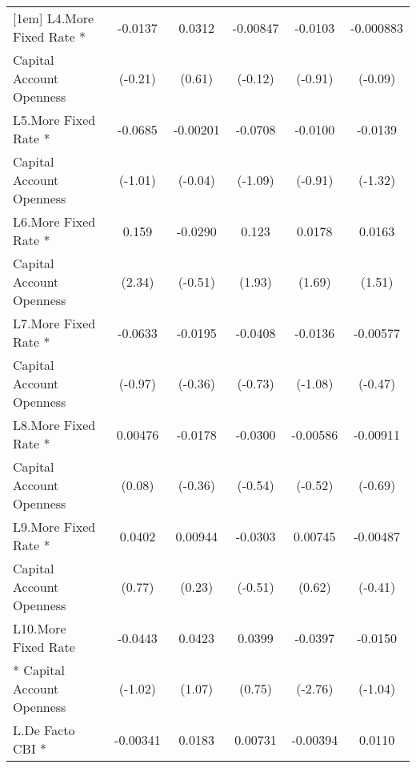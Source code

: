 {\begin{tabular}{l*{5}{c}}
[1em]
L4.More Fixed Rate *&     -0.0137         &      0.0312         &    -0.00847         &     -0.0103         &   -0.000883         \\
Capital Account Openness&     (-0.21)         &      (0.61)         &     (-0.12)         &     (-0.91)         &     (-0.09)         \\
[1em]
L5.More Fixed Rate *&     -0.0685         &    -0.00201         &     -0.0708         &     -0.0100         &     -0.0139         \\
Capital Account Openness&     (-1.01)         &     (-0.04)         &     (-1.09)         &     (-0.91)         &     (-1.32)         \\
[1em]
L6.More Fixed Rate *&       0.159\sym{*}  &     -0.0290         &       0.123         &      0.0178         &      0.0163         \\
Capital Account Openness&      (2.34)         &     (-0.51)         &      (1.93)         &      (1.69)         &      (1.51)         \\
[1em]
L7.More Fixed Rate *&     -0.0633         &     -0.0195         &     -0.0408         &     -0.0136         &    -0.00577         \\
Capital Account Openness&     (-0.97)         &     (-0.36)         &     (-0.73)         &     (-1.08)         &     (-0.47)         \\
[1em]
L8.More Fixed Rate *&     0.00476         &     -0.0178         &     -0.0300         &    -0.00586         &    -0.00911         \\
Capital Account Openness&      (0.08)         &     (-0.36)         &     (-0.54)         &     (-0.52)         &     (-0.69)         \\
[1em]
L9.More Fixed Rate *&      0.0402         &     0.00944         &     -0.0303         &     0.00745         &    -0.00487         \\
Capital Account Openness&      (0.77)         &      (0.23)         &     (-0.51)         &      (0.62)         &     (-0.41)         \\
[1em]
L10.More Fixed Rate &     -0.0443         &      0.0423         &      0.0399         &     -0.0397\sym{**} &     -0.0150         \\
* Capital Account Openness&     (-1.02)         &      (1.07)         &      (0.75)         &     (-2.76)         &     (-1.04)         \\
[1em]
L.De Facto CBI *    &    -0.00341         &      0.0183         &     0.00731         &    -0.00394         &      0.0110         \\

\end{tabular}}
